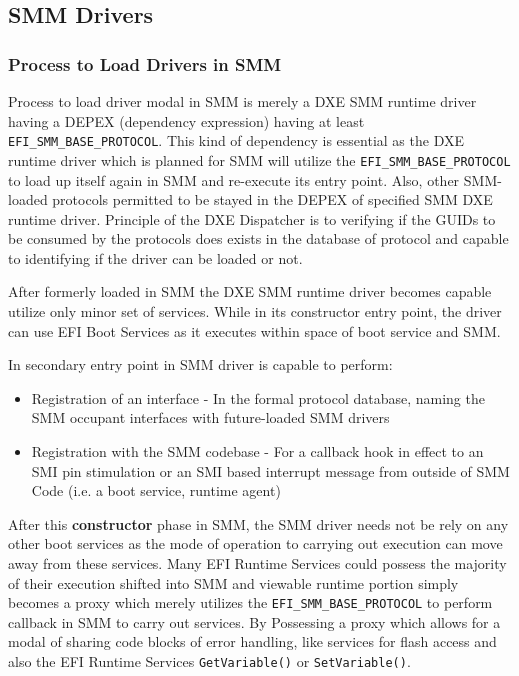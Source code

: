 \subsection{SMM Drivers}\label{subsection-smm-drivers}
\subsubsection{Process to Load Drivers in SMM}
Process to load driver modal in SMM is merely a DXE SMM runtime driver having a DEPEX (dependency expression) having at least \verb|EFI_SMM_BASE_PROTOCOL|. This kind of dependency is essential as the DXE runtime driver which is planned for SMM will utilize the \verb|EFI_SMM_BASE_PROTOCOL| to load up itself again in SMM and re-execute its entry point. Also, other SMM-loaded protocols permitted to be stayed in the DEPEX of specified SMM DXE runtime driver. Principle of the DXE Dispatcher is to verifying if the GUIDs to be consumed by the protocols does exists in the database of protocol and capable to identifying if the driver can be loaded or not.

After formerly loaded in SMM the DXE SMM runtime driver becomes capable utilize only minor set of services. While in its constructor entry point, the driver can use EFI Boot Services as it executes within space of boot service and SMM.

In secondary entry point in SMM driver is capable to perform:
\begin{itemize}
	\item Registration of an interface - In the formal protocol database, naming the SMM occupant interfaces with future-loaded SMM drivers
	\item Registration with the SMM codebase - For a callback hook in effect to an SMI pin stimulation or an SMI based interrupt message from outside of SMM Code (i.e. a boot service, runtime agent)
\end{itemize}

After this \textbf{constructor} phase in SMM, the SMM driver needs not be rely on any other boot services as the mode of operation to carrying out execution can move away from these services. Many EFI Runtime Services could possess the majority of their execution shifted into SMM and viewable runtime portion simply becomes a proxy which merely utilizes the \verb|EFI_SMM_BASE_PROTOCOL| to perform callback in SMM to carry out services. By Possessing a proxy which allows for a modal of sharing code blocks of error handling, like services for flash access and also the EFI Runtime Services \verb|GetVariable()| or \verb|SetVariable()|.

